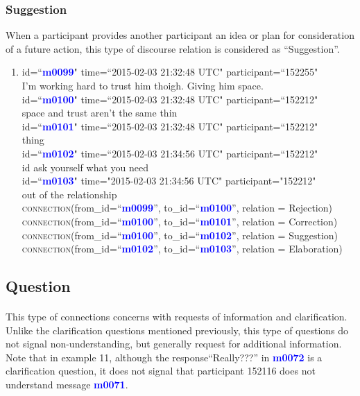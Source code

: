 \documentclass{article}
\begin{document}
\subsubsection{Suggestion}
When a participant provides another participant an idea or plan for consideration of a future action, this type of discourse relation is considered as ``Suggestion''.
\begin{enumerate}[resume]
\item id=``\textbf{\textcolor{blue}{m0099}}" time=``2015-02-03 21:32:48 UTC" participant=``152255"\\
I'm working hard to trust him thoigh. Giving him space. \\
id=``\textbf{\textcolor{blue}{m0100}}" time=``2015-02-03 21:32:48 UTC" participant=``152212" \\
space and trust aren’t the same thin \\
id=``\textbf{\textcolor{blue}{m0101}}" time=``2015-02-03 21:32:48 UTC" participant=``152212" \\
thing \\
id=``\textbf{\textcolor{blue}{m0102}}" time=``2015-02-03 21:34:56 UTC" participant=``152212" \\
id ask yourself what you need\\
id=``\textbf{\textcolor{blue}{m0103}}" time="2015-02-03 21:34:56 UTC" participant="152212"\\
out of the relationship\\
\textsc{connection}(from\_id=``\textbf{\textcolor{blue}{m0099}}'', to\_id=``\textbf{\textcolor{blue}{m0100}}'', relation = Rejection)\\
\textsc{connection}(from\_id=``\textbf{\textcolor{blue}{m0100}}'', to\_id=``\textbf{\textcolor{blue}{m0101}}'', relation = Correction)\\
\textsc{connection}(from\_id=``\textbf{\textcolor{blue}{m0100}}'', to\_id=``\textbf{\textcolor{blue}{m0102}}'', relation = Suggestion)\\
\textsc{connection}(from\_id=``\textbf{\textcolor{blue}{m0102}}'', to\_id=``\textbf{\textcolor{blue}{m0103}}'', relation = Elaboration)
\end{enumerate}

\subsection{Question}
\paragraph{}
This type of connections concerns with requests of information and clarification. Unlike the clarification questions mentioned previously, this type of questions do not signal non-understanding, but generally request for additional information. Note that in example 11, although the response``Really???'' in \textbf{\textcolor{blue}{m0072}} is a clarification question, it does not signal that participant 152116 does not understand message \textbf{\textcolor{blue}{m0071}}. 
\end{document}
